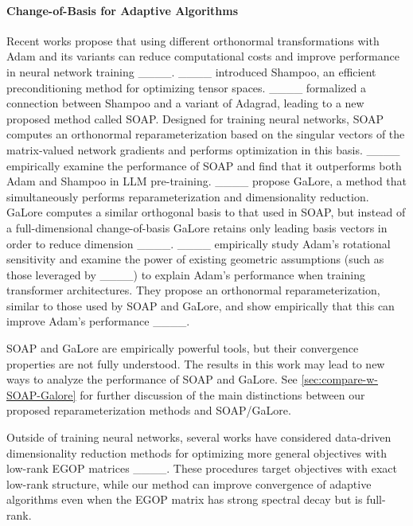 \paragraph{Change-of-Basis for Adaptive Algorithms} Recent works propose that using different orthonormal transformations with Adam and its variants can reduce computational costs and improve performance in neural network training ____. ____ introduced Shampoo, an efficient preconditioning method for optimizing tensor spaces. ____ formalized a connection between Shampoo and a variant of Adagrad, leading to a new proposed method called SOAP. Designed for training neural networks, SOAP computes an orthonormal reparameterization based on the singular vectors of the matrix-valued network gradients and performs optimization in this basis. ____ empirically examine the performance of SOAP and find that it outperforms both Adam and Shampoo in LLM pre-training. ____ propose GaLore, a method that simultaneously performs reparameterization and dimensionality reduction. GaLore computes a similar orthogonal basis to that used in SOAP, but instead of a full-dimensional change-of-basis GaLore retains only leading basis vectors in order to reduce dimension ____. ____ empirically study Adam's rotational sensitivity and examine the power of existing geometric assumptions (such as those leveraged by ____) to explain Adam's performance when training transformer architectures. They propose an orthonormal reparameterization, similar to those used by SOAP and GaLore, and show empirically that this can improve Adam's performance ____. 

SOAP and GaLore are empirically powerful tools, but their convergence properties are not fully understood. The results in this work may lead to new ways to analyze the performance of SOAP and GaLore. See \cref{sec:compare-w-SOAP-Galore} for further discussion of the main distinctions between our proposed reparameterization methods and SOAP/GaLore.

Outside of training neural networks, several works have considered data-driven dimensionality reduction methods for optimizing more general objectives with low-rank EGOP matrices ____. These procedures target objectives with exact low-rank structure, while our method can improve convergence of adaptive algorithms even when the EGOP matrix has strong spectral decay but is full-rank.

